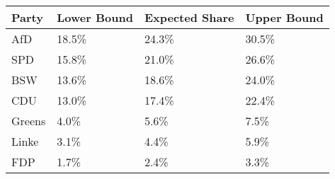 \begin{tabular}{llll}
  \hline
Party & Lower Bound & Expected Share & Upper Bound \\ 
  \hline
AfD & 18.5\% & 24.3\% & 30.5\% \\ 
  SPD & 15.8\% & 21.0\% & 26.6\% \\ 
  BSW & 13.6\% & 18.6\% & 24.0\% \\ 
  CDU & 13.0\% & 17.4\% & 22.4\% \\ 
  Greens & 4.0\% & 5.6\% & 7.5\% \\ 
  Linke & 3.1\% & 4.4\% & 5.9\% \\ 
  FDP & 1.7\% & 2.4\% & 3.3\% \\ 
   \hline
\end{tabular}
